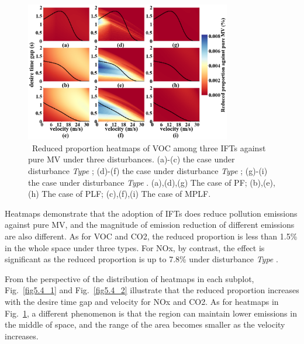 \documentclass[journal]{IEEEtran}
\begin{document}
\begin{figure}
  \includegraphics[width=9cm]{fig5.4_3.png}
  \caption{~Reduced proportion heatmaps of VOC among three IFTs against pure MV under three disturbances. (a)-(c) the case under disturbance \textit{Type \uppercase\expandafter{}}; (d)-(f) the case under disturbance \textit{Type \uppercase\expandafter{}}; (g)-(i) the case under disturbance \textit{Type \uppercase\expandafter{}}. (a),(d),(g) The case of PF; (b),(e),(h) The case of PLF; (c),(f),(i) The case of MPLF.} 
  \label{fig5.4_3}
\end{figure}





Heatmaps demonstrate that the adoption of IFTs does reduce pollution emissions against pure MV, and the magnitude of emission reduction of different emissions are also different. As for VOC and CO2, the reduced proportion is less than 1.5\% in the whole space under three types. For NOx, by contrast, the effect is significant as the reduced proportion is up to 7.8\% under disturbance \textit{Type \uppercase\expandafter{}}.

From the perspective of the distribution of heatmaps in each subplot, Fig.~\ref{fig5.4_1} and Fig.~\ref{fig5.4_2} illustrate that the reduced proportion increases with the desire time gap and velocity for NOx and CO2. As for heatmaps in Fig.~\ref{fig5.4_3}, a different phenomenon is that the region can maintain lower emissions in the middle of space, and the range of the area becomes smaller as the velocity increases.
\end{document}
